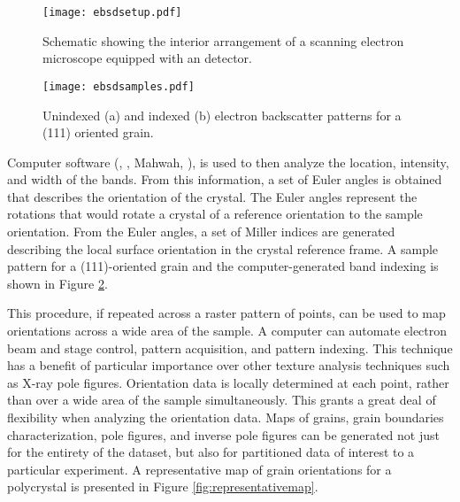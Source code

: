 \begin{figure}
\centering
	\texttt{[image: ebsdsetup.pdf]}
	\caption[Interior  arrangement for  analysis]{%
	Schematic showing the interior arrangement of a scanning 
	electron microscope equipped with an  detector.}
	\label{fig:ebsdsetup}
\end{figure}

\begin{figure}
\begin{center}
\texttt{[image: ebsdsamples.pdf]}
\caption[Electron backscatter diffraction patterns]{%
	Unindexed (a) and indexed (b) electron backscatter patterns 
	for a (111) oriented  grain.}
\label{fig:ebsdsamples}
\end{center}
\end{figure}
Computer software (, , Mahwah, ), is used to then analyze the location, intensity, and width of the bands. From this information, a set of Euler angles is obtained that describes the orientation of the crystal. The Euler angles represent the rotations that would rotate a crystal of a reference orientation to the sample orientation. From the Euler angles, a set of Miller indices are generated describing the local surface orientation in the crystal reference frame. A sample pattern for a (111)-oriented  grain and the computer-generated band indexing is shown in Figure \ref{fig:ebsdsamples}.


This procedure, if repeated across a raster pattern of points, can be used to map orientations across a wide area of the sample. A computer can automate electron beam and stage control, pattern acquisition, and pattern indexing. This technique has a benefit of particular importance over other texture analysis techniques such as X-ray pole figures. Orientation data is locally determined at each point, rather than over a wide area of the sample simultaneously. This grants a great deal of flexibility when analyzing the orientation data. Maps of grains, grain boundaries characterization, pole figures, and inverse pole figures can be generated not just for the entirety  of the dataset, but also for partitioned data of interest to a particular experiment. A representative map of grain orientations for a  polycrystal is presented in Figure \ref{fig:representativemap}.


